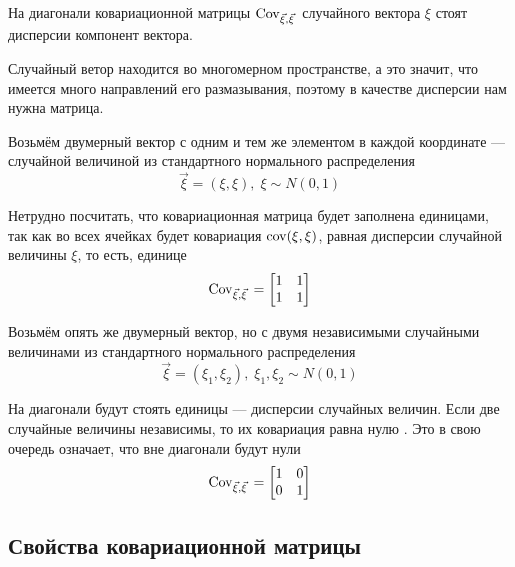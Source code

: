 \begin{remark}
    На диагонали ковариационной матрицы $\mathrm{Cov}_{\vec{\xi}, \vec{\xi}}\,$
    случайного вектора $\xi$ стоят дисперсии компонент вектора.
\end{remark}

Случайный ветор находится во многомерном пространстве, а это значит,
что имеется много направлений его размазывания, поэтому в качестве дисперсии
нам нужна матрица.

\begin{example}
    Возьмём двумерный вектор с одним и тем же элементом
    в каждой координате --- случайной величиной из стандартного нормального
    распределения
    $$\vec{\xi} = \left( \xi, \xi \right),\; \xi \sim N\left( 0, 1 \right)$$

    Нетрудно посчитать, что ковариационная матрица будет заполнена единицами,
    так как во всех ячейках будет ковариация $\mathrm{cov}\!\left( \xi, \xi \right)$, равная
    дисперсии случайной величины $\xi$, то есть, единице
    $$\mathrm{Cov}_{\vec{\xi}, \vec{\xi}}\, =
    \begin{bmatrix}
        1 & 1 \\
        1 & 1
    \end{bmatrix}$$
\end{example}

\begin{example}
    Возьмём опять же двумерный вектор, но с двумя независимыми
    случайными величинами из стандартного нормального распределения
    $$\vec{\xi} = \left( \xi_1, \xi_2 \right),\;
        \xi_1, \xi_2 \sim N\left( 0, 1 \right)$$

    На диагонали будут стоять единицы --- дисперсии случайных величин.
    Если две случайные величины независимы, то их ковариация равна нулю
    \cite[с.~244]{Feller1}. Это в свою очередь означает, что вне диагонали
    будут нули
    $$\mathrm{Cov}_{\vec{\xi}, \vec{\xi}}\, =
    \begin{bmatrix}
        1 & 0 \\
        0 & 1
    \end{bmatrix}$$
\end{example}

\subsection{Свойства ковариационной матрицы}

